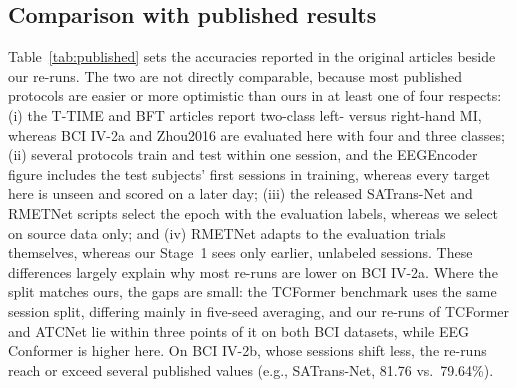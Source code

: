 \documentclass[preprint,12pt]{elsarticle}
\begin{document}
\subsection{Comparison with published results}
\label{subsec:published}

Table~\ref{tab:published} sets the accuracies reported in the original articles beside our re-runs. The two are not directly comparable, because most published protocols are easier or more optimistic than ours in at least one of four respects: (i) the T-TIME and BFT articles report two-class left- versus right-hand MI, whereas BCI IV-2a and Zhou2016 are evaluated here with four and three classes; (ii) several protocols train and test within one session, and the EEGEncoder figure includes the test subjects' first sessions in training, whereas every target here is unseen and scored on a later day; (iii) the released SATrans-Net and RMETNet scripts select the epoch with the evaluation labels, whereas we select on source data only; and (iv) RMETNet adapts to the evaluation trials themselves, whereas our Stage~1 sees only earlier, unlabeled sessions. These differences largely explain why most re-runs are lower on BCI IV-2a. Where the split matches ours, the gaps are small: the TCFormer benchmark \cite{altaheri2025tcformer} uses the same session split, differing mainly in five-seed averaging, and our re-runs of TCFormer and ATCNet lie within three points of it on both BCI datasets, while EEG Conformer is higher here. On BCI IV-2b, whose sessions shift less, the re-runs reach or exceed several published values (e.g., SATrans-Net, 81.76 vs.\ 79.64\%).
\end{document}
